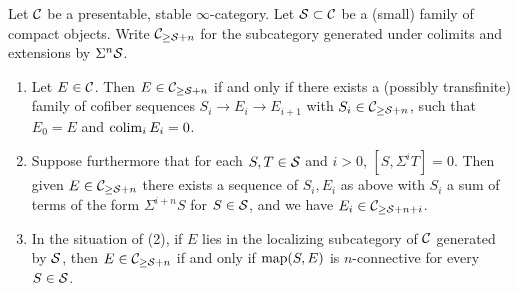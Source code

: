 \documentclass{amsart}
\numberwithin{proposition}{section}
\numberwithin{equation}{section}
\begin{document}
\begin{lemma} \label{lemm:cell-crit}
Let $\mathcal C$ be a presentable, stable $\infty$-category.
Let $\mathcal S \subset \mathcal C$ be a (small) family of compact objects.
Write $\mathcal C_{\ge \mathcal S+n}$ for the subcategory generated under colimits and extensions by $\Sigma^n \mathcal S$.

\begin{enumerate}
\item Let $E \in \mathcal C$.
  Then $E \in \mathcal C_{\ge \mathcal S+n}$ if and only if there exists a (possibly transfinite) family of cofiber sequences $S_i \to E_i \to E_{i+1}$ with $S_i \in \mathcal C_{\ge \mathcal S+n}$, such that $E_0 = E$ and $\operatorname*{colim}_i E_i = 0$.

\item Suppose furthermore that for each $S, T \in \mathcal S$ and $i > 0$, $[S, \Sigma^i T] = 0$.
  Then given $E \in \mathcal C_{\ge \mathcal S + n}$ there exists a sequence of $S_i, E_i$ as above with $S_i$ a sum of terms of the form $\Sigma^{i+n} S$ for $S \in \mathcal S$, and we have $E_i \in \mathcal C_{\ge \mathcal S+n+i}$.

\item In the situation of (2), if $E$ lies in the localizing subcategory of $\mathcal C$ generated by $\mathcal S$, then $E \in \mathcal C_{\ge \mathcal S + n}$ if and only if $\mathrm{map}(S, E)$ is $n$-connective for every $S \in \mathcal S$.
\end{enumerate}
\end{lemma}
\end{document}
